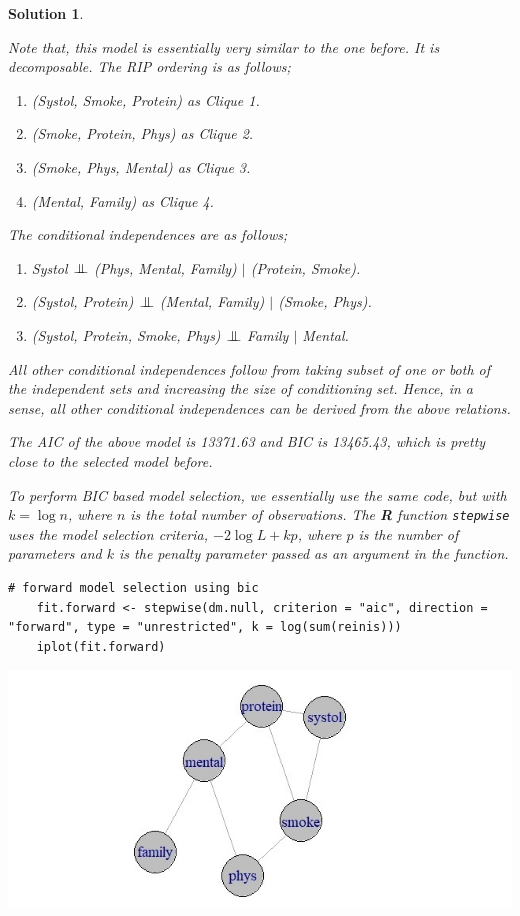 \documentclass[12pt]{article}
\theoremstyle{problemstyle}
\newtheorem*{solution*}{Solution}
\newcommand{\indep}{\mathrel{\text{\scalebox{1.07}{$\perp\mkern-10mu\perp$}}}}
\begin{document}
\begin{solution*}
\begin{enumerate}
	Note that, this model is essentially very similar to the one before. It is decomposable. The RIP ordering is as follows;
	\begin{enumerate}
		\item (Systol, Smoke, Protein) as Clique 1.
		\item (Smoke, Protein, Phys) as Clique 2.
		\item (Smoke, Phys, Mental) as Clique 3.
		\item (Mental, Family) as Clique 4.
	\end{enumerate}
	
	The conditional independences are as follows;
	\begin{enumerate}
		\item Systol $\indep$ (Phys, Mental, Family) $\mid$ (Protein, Smoke).
		\item (Systol, Protein) $\indep$  (Mental, Family) $\mid$ (Smoke, Phys).
		\item (Systol, Protein, Smoke, Phys) $\indep$ Family $\mid$ Mental.
	\end{enumerate}
	All other conditional independences follow from taking subset of one or both of the independent sets and increasing the size of conditioning set. Hence, in a sense, all other conditional independences can be derived from the above relations.
	
	
	The AIC of the above model is 13371.63 and BIC is 13465.43, which is pretty close to the selected model before.
	
	To perform BIC based model selection, we essentially use the same code, but with $k = \log n$, where $n$ is the total number of observations. The \textbf{R} function \texttt{stepwise} uses the model selection criteria, $-2\log L + kp$, where $p$ is the number of parameters and $k$ is the penalty parameter passed as an argument in the function.
	
	\begin{lstlisting}[style = R-code]
	# forward model selection using bic
	fit.forward <- stepwise(dm.null, criterion = "aic", direction = "forward", type = "unrestricted", k = log(sum(reinis)))
	iplot(fit.forward)
	\end{lstlisting}
	
	\includegraphics[width=\linewidth]{reinis-bic-forward.jpeg}
	

\end{enumerate}
\end{solution*}
\end{document}
